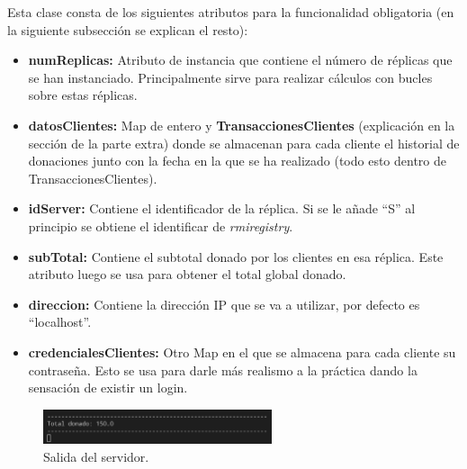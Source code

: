 \documentclass{article}
\begin{document}
Esta clase consta de los siguientes atributos para la funcionalidad obligatoria (en la siguiente subsección se explican el resto):
\begin{itemize}
    \item \textbf{numReplicas: }Atributo de instancia que contiene el número de réplicas que se han instanciado. Principalmente sirve para realizar cálculos con bucles sobre estas réplicas.
    
    \item \textbf{datosClientes: }Map de entero y \textbf{TransaccionesClientes} (explicación en la sección de la parte extra) donde se almacenan para cada cliente el historial de donaciones junto con la fecha en la que se ha realizado (todo esto dentro de TransaccionesClientes).
    \item \textbf{idServer: }Contiene el identificador de la réplica. Si se le añade ``S'' al principio se obtiene el identificar de \textit{rmiregistry}.
    \item \textbf{subTotal: }Contiene el subtotal donado por los clientes en esa réplica. Este atributo luego se usa para obtener el total global donado. 
    \item \textbf{direccion: }Contiene la dirección IP que se va a utilizar, por defecto es ``localhost''.
    \item \textbf{credencialesClientes: }Otro Map en el que se almacena para cada cliente su contraseña. Esto se usa para darle más realismo a la práctica dando la sensación de existir un login.    
\end{itemize}

\begin{figure}[H]
    \centering
    \includegraphics[width=0.6\textwidth]{imagenes/donObligatorioServer.png}
    \caption{Salida del servidor.}
\end{figure}
\end{document}
